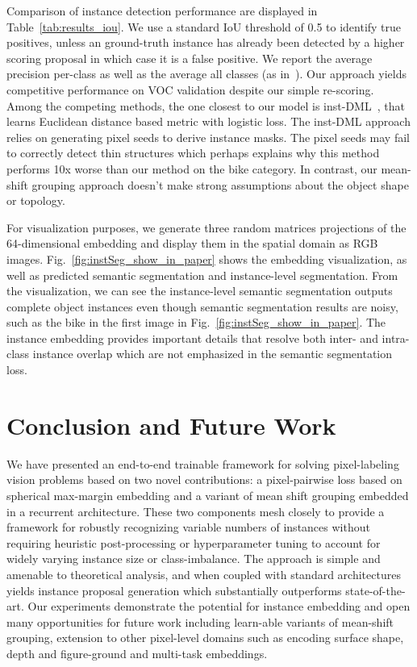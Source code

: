 \documentclass[10pt,twocolumn,letterpaper]{article}
\begin{document}
Comparison of instance detection performance are displayed in
Table~\ref{tab:results_iou}.  We use a standard IoU threshold of 0.5 to
identify true positives, unless an ground-truth instance has already been
detected by a higher scoring proposal in which case it is a false positive.  We
report the average precision per-class as well as the average all classes (as
in~\cite{hariharan2011semantic}).  Our approach yields competitive performance
on VOC validation despite our simple re-scoring.  Among the competing methods,
the one closest to our model is inst-DML~\cite{fathi2017semantic}, that learns
Euclidean distance based metric with logistic loss.  The inst-DML approach
relies on generating pixel seeds to derive instance masks.  The pixel seeds may
fail to correctly detect thin structures which perhaps explains why this method
performs 10x worse than our method on the bike category. In contrast, our
mean-shift grouping approach doesn't make strong assumptions about the
object shape or topology.

For visualization purposes, we generate three random matrices projections of
the 64-dimensional embedding and display them in the spatial domain as RGB
images.  Fig.~\ref{fig:instSeg_show_in_paper} shows the embedding
visualization, as well as predicted semantic segmentation and instance-level
segmentation.  From the visualization, we can see the instance-level semantic
segmentation outputs complete object instances even though semantic
segmentation results are noisy, such as the bike in the first image in
Fig.~\ref{fig:instSeg_show_in_paper}. The instance embedding provides
important details that resolve both inter- and intra-class instance overlap
which are not emphasized in the semantic segmentation loss.


\section{Conclusion and Future Work}
We have presented an end-to-end trainable framework for solving pixel-labeling
vision problems based on two novel contributions: a pixel-pairwise loss based
on spherical max-margin embedding and a variant of mean shift grouping embedded
in a recurrent architecture. These two components mesh closely to provide a
framework for robustly recognizing variable numbers of instances without
requiring heuristic post-processing or hyperparameter tuning to account for
widely varying instance size or class-imbalance. The approach is simple and
amenable to theoretical analysis, and when coupled with standard architectures
yields instance proposal generation which substantially outperforms
state-of-the-art. Our experiments demonstrate the potential for instance
embedding and open many opportunities for future work including learn-able
variants of mean-shift grouping, extension to other pixel-level domains such as
encoding surface shape, depth and figure-ground and multi-task embeddings.
\end{document}
